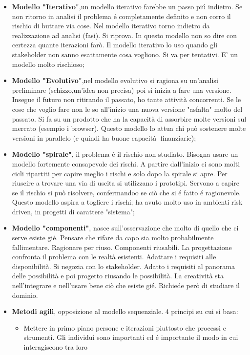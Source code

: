 \documentclass[a4paper,10pt] {article}
\begin{document}
\begin{itemize}
\begin{itemize}
\begin{itemize}
	
	\item \textbf{Modello "Iterativo"},un modello iterativo farebbe un passo 
	pi\'u indietro. Se non ritorno in analisi il problema é completamente 
	definito e non corro il rischio di buttare via cose. Nel modello 
	iterativo torno indietro da realizzazione ad analisi (fasi). Si riprova. In 
	questo modello non so dire con certezza quante iterazioni farò.
	Il modello iterativo lo uso quando gli stakeholder non sanno esattamente 
	cosa vogliono. Si va per tentativi. E' un modello molto rischioso;
	
	
	\item \textbf{Modello "Evolutivo"},nel modello evolutivo si ragiona su 
	un'analisi preliminare (schizzo,un'idea non precisa) poi si inizia
	a fare una versione. Insegue il futuro non ritirando il passato, ho tante 
	attività concorrenti. Se le cose
	che voglio fare non le so all'inizio una nuova versione "asfalta" molto del 
	passato. Si fa su un prodotto che ha la capacità di assorbire molte 
	versioni sul mercato (esempio i browser). Questo modello lo attua chi può 
	sostenere molte versioni in parallelo (e quindi ha buone 
	capacità finanziarie);
	
	
	\item \textbf{Modello "spirale"}, il problema é il rischio non studiato. 
	Bisogna usare un modello fortemente consapevole dei rischi. A partire 
	dall'inizio ci sono molti cicli ripartiti per capire meglio i rischi e solo
	dopo la spirale si apre. Per riuscire a trovare una via di uscita si 
	utilizzano i prototipi. Servono a capire se il rischio si può risolvere, 
	confermandoo se ciò che si é fatto é ragionevole. Questo modello 
	aspira a togliere i rischi; ha avuto molto uso in ambienti risk driven, in 
	progetti di carattere "sistema";
	
	
	\item \textbf{Modello "componenti"}, nasce sull'osservazione che molto di 
	quello che ci serve esiste gié. Pensare che rifare da capo sia molto 
	probabilmente fallimentare. Ragionare per riuso. Componenti riusabili.
	La progettazione confronta il problema con le realtà esistenti. Adattare 
	i requisiti alle disponibilità. 
	Si negozia con lo stakeholder. Adatto i requisiti al panorama delle 
	possibilità e poi progetto riusando le possibilità. La creatività sta 
	nell'integrare e nell'usare bene ciò che esiste gié. Richiede però di 
	studiare il dominio.
	
	
	\item \textbf{Metodi agili}, opposizione al modello sequenziale. 4 principi 
	su cui si basa:
	\begin{itemize}
	\item Mettere in primo piano persone e iterazioni piuttosto che processi e 
	strumenti. Gli individui sono importanti ed é importante il modo in cui 
	interagiscono tra loro
	

\end{itemize}
\end{itemize}
\end{itemize}
\end{itemize}
\end{document}
